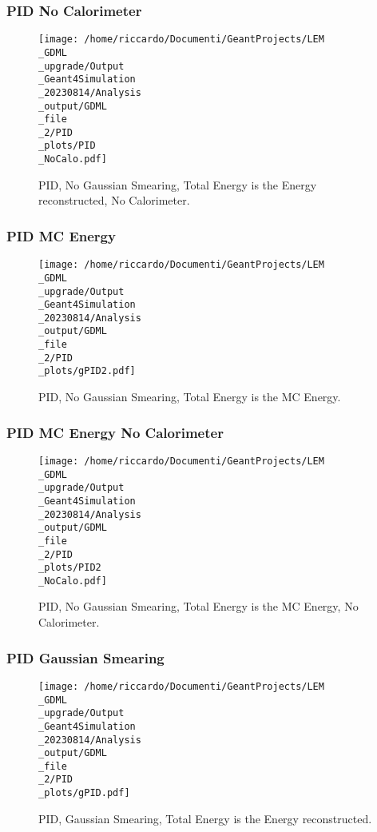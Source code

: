 \documentclass[8pt]{beamer}
\begin{document}
            \begin{frame}
                \frametitle{PID No Calorimeter}
            
        \begin{figure}[h]
            \centering
            \texttt{[image: /home/riccardo/Documenti/GeantProjects/LEM\\\_GDML\\\_upgrade/Output\\\_Geant4Simulation\\\_20230814/Analysis\\\_output/GDML\\\_file\\\_2/PID\\\_plots/PID\\\_NoCalo.pdf]}
            \caption{PID, No Gaussian Smearing, Total Energy is the Energy reconstructed, No Calorimeter.}
        \end{figure}
        
            \end{frame}
            
            \begin{frame}
                \frametitle{PID MC Energy}
            
        \begin{figure}[h]
            \centering
            \texttt{[image: /home/riccardo/Documenti/GeantProjects/LEM\\\_GDML\\\_upgrade/Output\\\_Geant4Simulation\\\_20230814/Analysis\\\_output/GDML\\\_file\\\_2/PID\\\_plots/gPID2.pdf]}
            \caption{PID, No Gaussian Smearing, Total Energy is the MC Energy.}
        \end{figure}
        
            \end{frame}
            
            \begin{frame}
                \frametitle{PID MC Energy No Calorimeter}
            
        \begin{figure}[h]
            \centering
            \texttt{[image: /home/riccardo/Documenti/GeantProjects/LEM\\\_GDML\\\_upgrade/Output\\\_Geant4Simulation\\\_20230814/Analysis\\\_output/GDML\\\_file\\\_2/PID\\\_plots/PID2\\\_NoCalo.pdf]}
            \caption{PID, No Gaussian Smearing, Total Energy is the MC Energy, No Calorimeter.}
        \end{figure}
        
            \end{frame}
            
            \begin{frame}
                \frametitle{PID Gaussian Smearing}
            
        \begin{figure}[h]
            \centering
            \texttt{[image: /home/riccardo/Documenti/GeantProjects/LEM\\\_GDML\\\_upgrade/Output\\\_Geant4Simulation\\\_20230814/Analysis\\\_output/GDML\\\_file\\\_2/PID\\\_plots/gPID.pdf]}
            \caption{PID, Gaussian Smearing, Total Energy is the Energy reconstructed.}
        \end{figure}
        
            \end{frame}
            
\end{document}
